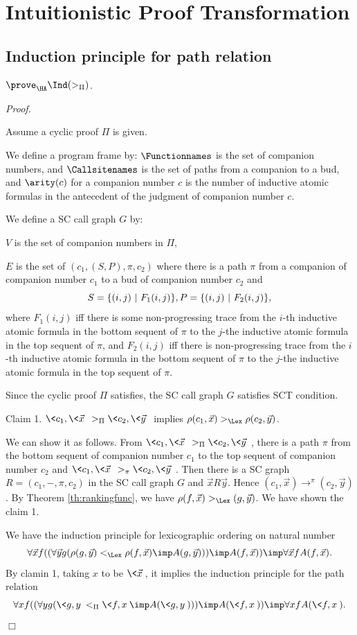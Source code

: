 \section{Intuitionistic Proof Transformation}

\subsection{Induction principle for path relation}

\begin{Prop}
$\prove_\HA \Ind(>_\Pi)$.
\end{Prop}

{\em Proof.}

Assume a cyclic proof $\Pi$ is given.

We define a program frame by:
$\Functionnames$ is the set of companion numbers,
and
$\Callsitenames$ is the set of paths from a companion to a bud,
and
$\arity(c)$ for a companion number $c$ is the number of
inductive atomic formulas in the antecedent of the judgment
of companion number $c$.

We define a SC call graph $G$ by:

$V$ is the set of companion numbers in $\Pi$,

$E$ is the set of $(c_1,(S,P),\pi,c_2)$ where
there is a path $\pi$ from a companion of companion number $c_1$ to a bud
of companion number $c_2$ and
\[
S = \{ (i,j) \ |\ F_1(i,j) \}, \\
P = \{ (i,j) \ |\ F_2(i,j) \},
\]
where $F_1(i,j)$ iff
there is some non-progressing trace from
the $i$-th inductive atomic formula in the bottom sequent of $\pi$
to the $j$-the inductive atomic formula in the top sequent of $\pi$,
and
$F_2(i,j)$ iff
there is non-progressing trace from
the $i$-th inductive atomic formula in the bottom sequent of $\pi$
to the $j$-the inductive atomic formula in the top sequent of $\pi$.

Since the cyclic proof $\Pi$ satisfies, the SC call graph $G$ satisfies
SCT condition.

Claim 1. $\<c_1,\<\Vec x\>\> >_\Pi \<c_2,\<\Vec y\>\>$ implies
$\rho(c_1,\Vec x) >_\Lex \rho(c_2,\Vec y)$.

We can show it as follows.
From $\<c_1,\<\Vec x\>\> >_\Pi \<c_2,\<\Vec y\>\>$,
there is a path $\pi$ from the bottom sequent of companion number $c_1$
to the top sequent of companion number $c_2$ and
$\<c_1,\<\Vec x\>\> >_\pi \<c_2,\<\Vec y\>\>$.
Then there is a SC graph $R=(c_1,-,\pi,c_2)$ in the SC call graph $G$
and $\Vec x R \Vec y$.
Hence $(c_1,\Vec x) \to^\pi (c_2,\Vec y)$.
By Theorem \ref{th:rankingfunc}, we have
$\rho(f, \Vec x) >_\Lex (g, \Vec y)$.
We have shown the claim 1.

We have the induction principle for lexicographic ordering on natural number
\[
\forall \Vec xf((\forall \Vec yg(\rho(g,\Vec y) <_\Lex \rho(f,\Vec x) \imp A(g,\Vec y)))
\imp A(f,\Vec x))
\imp \forall \Vec xf A(f,\Vec x).
\]
By clamin 1, taking $x$ to be $\<\Vec x\>$,
it implies the induction principle for the path relation
\[
\forall xf((\forall yg(\<g,y\> <_\Pi \<f,x\> \imp A(\<g,y\>)))
\imp A(\<f,x\>))
\imp \forall xf A(\<f,x\>).
\]
$\Box$
